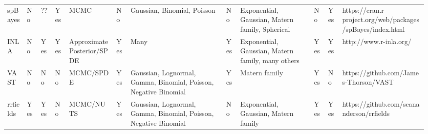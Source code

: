 \documentclass[12pt,english]{article}
\begin{document}
\begin{landscape}
\begin{table}
\begin{scriptsize}
\begin{tabular}{llllL{2cm}lL{2.5cm}lL{2.5cm}llL{2.5cm}}
        spBayes  & No             & ??      & Yes     & MCMC                        & No         & Gaussian, Binomial, Poisson                                      & No         & Exponential, Gaussian, Matern family, Spherical    & No        & Yes                    & https://cran.r-project.org/web/packages/spBayes/index.html \\
        INLA     & No             & Yes     & Yes     & Approximate Posterior/SPDE  & Yes        & Many                                                             & Yes        & Exponential, Gaussian, Matern family, many others  & Yes       & Yes                    & http://www.r-inla.org/                                     \\
        VAST     & No             & No      & No      & MCMC/SPDE                   & Yes        & Gaussian, Lognormal, Gamma, Binomial, Poisson, Negative Binomial & Yes        & Matern family                                      & Yes       & No                     & https://github.com/James-Thorson/VAST                      \\
        rrfields & Yes            & Yes     & No      & MCMC/NUTS                   & Yes        & Gaussian, Lognormal, Gamma, Binomial, Poisson, Negative Binomial & No         & Exponential, Gaussian, Matern family               & Yes       & Yes                    & https://github.com/seananderson/rrfields                   \\
        \bottomrule
      \end{tabular}
    \end{scriptsize}

  \end{table}
\end{landscape}
\end{document}
